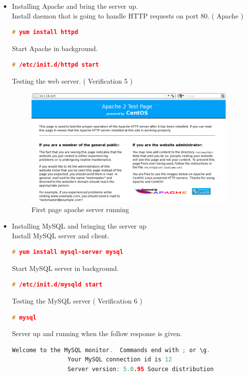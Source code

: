 \begin{itemize}
		\item Installing Apache and bring the server up.\\
			Install daemon that is going to handle HTTP requests on port 80. ( Apache )
			\begin{lstlisting}[language=c, stepnumber=0, tabsize=1]
				# yum install httpd
			\end{lstlisting}
			Start Apache in background.
			\begin{lstlisting}[language=c, stepnumber=0, tabsize=1]
				# /etc/init.d/httpd start
			\end{lstlisting}			
			Testing the web server. ( Verification 5 )
			\begin{figure}[H]
				\begin{centering}
					\includegraphics[width=1.0\textwidth]{images/first_web.png}
					\caption{First page apache server running}
				\end{centering}
			\end{figure}
		\item Installing MySQL and bringing the server up\\
			Install MySQL server and client.
			\begin{lstlisting}[language=c, stepnumber=0, tabsize=1]
				# yum install mysql-server mysql
			\end{lstlisting}
			Start MySQL server in background.
			\begin{lstlisting}[language=c, stepnumber=0, tabsize=1]
				# /etc/init.d/mysqld start
			\end{lstlisting}
			Testing the MySQL server ( Verification 6 )
			\begin{lstlisting}[language=c, stepnumber=0, tabsize=1]
				# mysql
			\end{lstlisting}
			Server up and running when the follow response is given.
			\begin{lstlisting}[language=c, stepnumber=0, tabsize=1]
				Welcome to the MySQL monitor.  Commands end with ; or \g.
				Your MySQL connection id is 12
				Server version: 5.0.95 Source distribution


\end{lstlisting}
\end{itemize}
